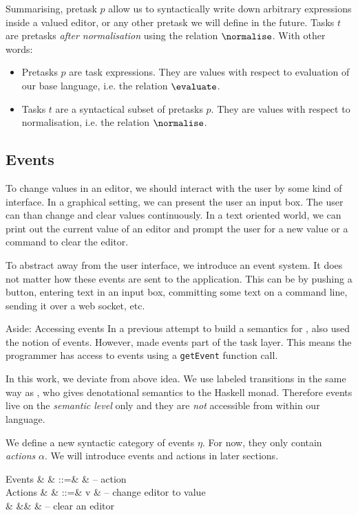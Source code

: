 Summarising, pretask $p$ allow us to syntactically write down arbitrary expressions inside a valued editor,
or any other pretask we will define in the future.
Tasks $t$ are pretasks \emph{after normalisation} using the relation $\normalise$.
With other words:
\begin{itemize}
  \item
    Pretasks $p$ are task expressions.
    They are values with respect to evaluation of our base language, i.e. the relation $\evaluate$.
  \item
    Tasks $t$ are a syntactical subset of pretasks $p$.
    They are values with respect to normalisation, i.e. the relation $\normalise$.
\end{itemize}


\subsection{Events}

To change values in an editor,
we should interact with the user by some kind of interface.
In a graphical setting,
we can present the user an input box.
The user can than change and clear values continuously.
In a text oriented world,
we can print out the current value of an editor
and prompt the user for a new value
or a command to clear the editor.

To abstract away from the user interface,
we introduce an event system.
It does not matter how these events are sent to the application.
This can be by pushing a button,
entering text in an input box,
committing some text on a command line,
sending it over a web socket,
etc.

\begin{margintext}{Aside: Accessing events}
In a previous attempt to build a semantics for \TOP,
\textcite{theses/radboud/VinterHviid18} also used the notion of events.
However, \citeauthor{theses/radboud/VinterHviid18} made events part of the task layer.
This means the programmer has access to events using a \texttt{getEvent} function call.

In this work,
we deviate from above idea.
We use labeled transitions in the same way as \textcite{school/maktoberdorf/PeytonJones01},
who gives denotational semantics to the Haskell \IO monad.
Therefore events live on the \emph{semantic level} only
and they are \emph{not} accessible from within our language.
\end{margintext}

We define a new syntactic category of events $\eta$.
For now, they only contain \emph{actions} $\alpha$.
We will introduce events and actions in later sections.
\begin{grammar}
  Events
    & \eta   & ::=& \alpha & – action \\
  Actions
    & \alpha & ::=& v      & – change editor to value \\
    &        &\mid& \Clear & – clear an editor \\
\end{grammar}

